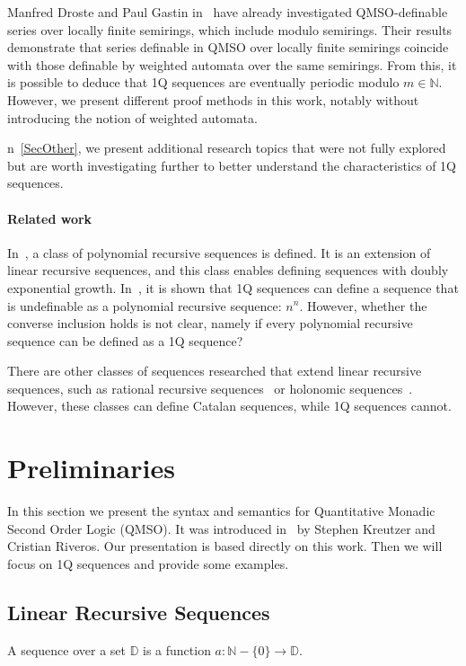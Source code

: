 \documentclass[12pt]{article}
\theoremstyle{definition}
\begin{document}
Manfred Droste and Paul Gastin in~\cite{DrosteG07} have already investigated QMSO-definable series over locally finite semirings, which include modulo semirings. Their results demonstrate that series definable in QMSO over locally finite semirings coincide with those definable by weighted automata over the same semirings. From this, it is possible to deduce that 1Q sequences are eventually periodic modulo $m \in \mathbb{N}$. However, we present different proof methods in this work, notably without introducing the notion of weighted automata.

n~\cref{SecOther}, we present additional research topics that were not fully explored but are worth investigating further to better understand the characteristics of 1Q sequences.

\paragraph*{Related work}
In~\cite{CadilhacMPPS20}, a class of polynomial recursive sequences is defined. It is an extension of linear recursive sequences, and this class enables defining sequences with doubly exponential growth. In~\cite{CadilhacMPPS20}, it is shown that 1Q sequences can define a sequence that is undefinable as a polynomial recursive sequence: $n^n$. However, whether the converse inclusion holds is not clear, namely if every polynomial recursive sequence can be defined as a 1Q sequence?

There are other classes of sequences researched that extend linear recursive sequences, such as rational recursive sequences~\cite{ClementeDMP23} or holonomic sequences~\cite{KenisonKLLMOW021}. However, these classes can define Catalan sequences, while 1Q sequences cannot.

\section{Preliminaries}
In this section we present the syntax and semantics for Quantitative Monadic Second Order Logic (QMSO). It was introduced in~\cite{KreutzerR13} by Stephen Kreutzer and Cristian Riveros. Our presentation is based directly on this work. Then we will focus on 1Q sequences and provide some examples.

\subsection{Linear Recursive Sequences}
A sequence over a set $\mathbb{D}$ is a function $a : \mathbb{N} - \{0\} \rightarrow \mathbb{D}$.
\end{document}
